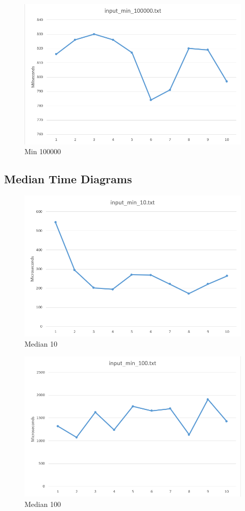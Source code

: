 \documentclass[a4paper, 12pt, titlepage]{article}
\begin{document}
\begin{figure}[H]
	\centering
	\caption{Min 100000}
	\includegraphics[width=.75\textwidth]{min100000.png} %
\end{figure}

\subsection{Median Time Diagrams}

\begin{figure}[H]
	\centering
	\caption{Median 10}
	\includegraphics[width=.75\textwidth]{min10.png} %
\end{figure}

\begin{figure}[H]
	\centering
	\caption{Median 100}
	\includegraphics[width=.75\textwidth]{min100.png} %
\end{figure}
\end{document}
